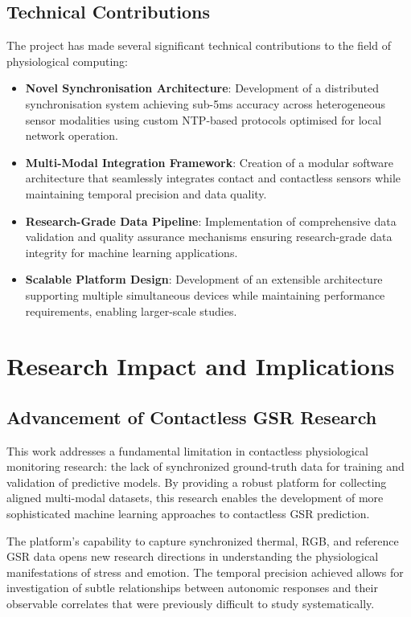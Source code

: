 \subsection{Technical Contributions}

The project has made several significant technical contributions to the field of physiological computing:

\begin{itemize}
\item \textbf{Novel Synchronisation Architecture}: Development of a distributed synchronisation system achieving sub-5ms accuracy across heterogeneous sensor modalities using custom NTP-based protocols optimised for local network operation.

\item \textbf{Multi-Modal Integration Framework}: Creation of a modular software architecture that seamlessly integrates contact and contactless sensors while maintaining temporal precision and data quality.

\item \textbf{Research-Grade Data Pipeline}: Implementation of comprehensive data validation and quality assurance mechanisms ensuring research-grade data integrity for machine learning applications.

\item \textbf{Scalable Platform Design}: Development of an extensible architecture supporting multiple simultaneous devices while maintaining performance requirements, enabling larger-scale studies.
\end{itemize}

\section{Research Impact and Implications}

\subsection{Advancement of Contactless GSR Research}

This work addresses a fundamental limitation in contactless physiological monitoring research: the lack of synchronized ground-truth data for training and validation of predictive models. By providing a robust platform for collecting aligned multi-modal datasets, this research enables the development of more sophisticated machine learning approaches to contactless GSR prediction.

The platform's capability to capture synchronized thermal, RGB, and reference GSR data opens new research directions in understanding the physiological manifestations of stress and emotion. The temporal precision achieved allows for investigation of subtle relationships between autonomic responses and their observable correlates that were previously difficult to study systematically.

